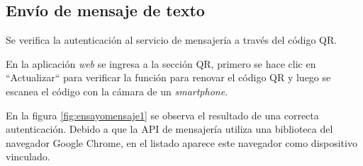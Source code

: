 \subsection{Envío de mensaje de texto}
\label{subsec:ensayomensaje}

Se verifica la autenticación al servicio de mensajería a través del código QR. 

En la aplicación \textit{web} se ingresa a la sección QR, primero se hace clic en ``Actualizar`` para verificar la función para renovar el código QR y luego se escanea el código con la cámara de un \textit{smartphone}.

En la figura \ref{fig:ensayomensaje1} se observa el resultado de una correcta autenticación. Debido a que la API de mensajería utiliza una biblioteca del navegador Google Chrome, en el listado aparece este navegador como dispositivo vinculado.

